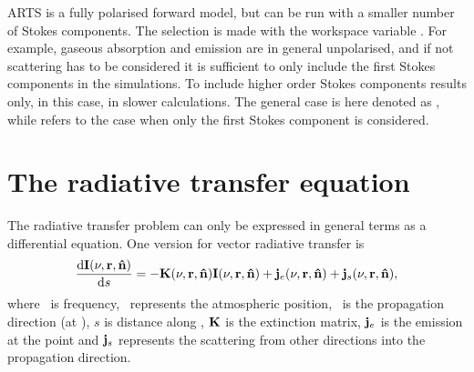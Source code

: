 ARTS is a fully polarised forward model, but can be run with a smaller
number of Stokes components. The selection is made with the workspace
variable . For example, gaseous absorption and
emission are in general unpolarised, and if not scattering has to be
considered it is sufficient to only include the first Stokes
components in the simulations. To include higher order Stokes
components results only, in this case, in slower calculations. The
general case is here denoted as ,
while  refers to the case when
only the first Stokes component is considered.
 


\section{The radiative transfer equation}
\label{sec:rteq}

The radiative transfer problem can only be expressed in general terms as a
differential equation. One version for vector radiative transfer is
\begin{equation}
    \label{eq:VRTE0}
  \frac {\mathrm{d}{\bf I}(\nu,{\bf r},{\bf \hat{n}})}{\mathrm{d} s} =
    -{\bf K}(\nu,{\bf r},{\bf \hat{n}}) {\bf I}(\nu,{\bf r},{\bf \hat{n}}) +
    \mathbf{j}_e(\nu,{\bf r},{\bf \hat{n}}) + \mathbf{j}_s(\nu,{\bf r},{\bf \hat{n}}),  
\end{equation}
where \Frq\ is frequency, \PPos\ represents the atmospheric position, \PDir\ is
the propagation direction (at \PPos), $s$ is distance along \PDir, ${\bf K}$ is
the extinction matrix, $\mathbf{j}_e$ is the emission at the point
and $\mathbf{j}_s$ represents the scattering from other directions into the
propagation direction.


